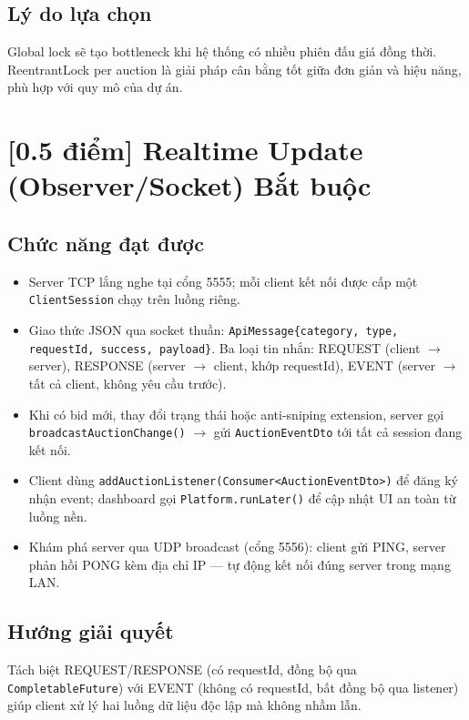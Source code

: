 \documentclass[12pt,a4paper]{article}
\newcommand{\score}[1]{\textbf{[#1 điểm]}}
\newcommand{\mandatory}{\textcolor{mandatorycolor}{\textbf{Bắt buộc}}}
\begin{document}
\subsection*{Lý do lựa chọn}
Global lock sẽ tạo bottleneck khi hệ thống có nhiều phiên đấu giá đồng thời. ReentrantLock per auction là giải pháp cân bằng tốt giữa đơn giản và hiệu năng, phù hợp với quy mô của dự án.

\section{\score{0.5} Realtime Update (Observer/Socket) \hfill \mandatory}

\subsection*{Chức năng đạt được}

\begin{itemize}[leftmargin=1.5em]
  \item Server TCP lắng nghe tại cổng 5555; mỗi client kết nối được cấp một \texttt{ClientSession} chạy trên luồng riêng.
  \item Giao thức JSON qua socket thuần: \texttt{ApiMessage\{category, type, requestId, success, payload\}}. Ba loại tin nhắn: REQUEST (client $\to$ server), RESPONSE (server $\to$ client, khớp requestId), EVENT (server $\to$ tất cả client, không yêu cầu trước).
  \item Khi có bid mới, thay đổi trạng thái hoặc anti-sniping extension, server gọi \texttt{broadcastAuctionChange()} $\to$ gửi \texttt{AuctionEventDto} tới tất cả session đang kết nối.
  \item Client dùng \texttt{addAuctionListener(Consumer<AuctionEventDto>)} để đăng ký nhận event; dashboard gọi \texttt{Platform.runLater()} để cập nhật UI an toàn từ luồng nền.
  \item Khám phá server qua UDP broadcast (cổng 5556): client gửi PING, server phản hồi PONG kèm địa chỉ IP — tự động kết nối đúng server trong mạng LAN.
\end{itemize}

\subsection*{Hướng giải quyết}
Tách biệt REQUEST/RESPONSE (có requestId, đồng bộ qua \texttt{CompletableFuture}) với EVENT (không có requestId, bất đồng bộ qua listener) giúp client xử lý hai luồng dữ liệu độc lập mà không nhầm lẫn.
\end{document}
